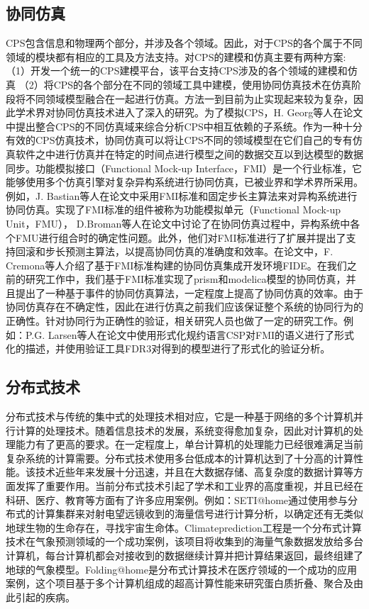 \subsection{协同仿真}
CPS包含信息和物理两个部分，并涉及各个领域。因此，对于CPS的各个属于不同领域的模块都有相应的工具及方法支持。对CPS的建模和仿真主要有两种方案: （1）开发一个统一的CPS建模平台，该平台支持CPS涉及的各个领域的建模和仿真 （2）将CPS的各个部分在不同的领域工具中建模，使用协同仿真技术在仿真阶段将不同领域模型融合在一起进行仿真。方法一到目前为止实现起来较为复杂，因此学术界对协同仿真技术进入了深入的研究。为了模拟CPS，H. Georg等人在论文\cite{Georg2014Analyzing}中提出整合CPS的不同仿真域来综合分析CPS中相互依赖的子系统。作为一种十分有效的CPS仿真技术，协同仿真可以将让CPS不同的领域模型在它们自己的专有仿真软件之中进行仿真并在特定的时间点进行模型之间的数据交互以到达模型的数据同步。功能模拟接口（Functional Mock-up Interface，FMI）\cite{Arnold2011FMI}是一个行业标准，它能够使用多个仿真引擎对复杂异构系统进行协同仿真，已被业界和学术界所采用。例如，J. Bastian等人在论文\cite{Bastian2011Master}中采用FMI标准和固定步长主算法来对异构系统进行协同仿真。实现了FMI标准的组件被称为功能模拟单元（Functional Mock-up Unit，FMU）\cite{Tripakis15}， D.Broman等人在论文\cite{Broman2013Determinate}中讨论了在协同仿真过程中，异构系统中各个FMU进行组合时的确定性问题。此外，他们对FMI标准进行了扩展并提出了支持回滚和步长预测主算法，以提高协同仿真的准确度和效率。在论文\cite{Cremona2016FIDE}中，F. Cremona等人介绍了基于FMI标准构建的协同仿真集成开发环境FIDE。在我们之前的研究工作\cite{LiuJWCD16}中，我们基于FMI标准实现了prism和modelica模型的协同仿真，并且提出了一种基于事件的协同仿真算法，一定程度上提高了协同仿真的效率。由于协同仿真存在不确定性，因此在进行仿真之前我们应该保证整个系统的协同行为的正确性。针对协同行为正确性的验证，相关研究人员也做了一定的研究工作。例如：P.G. Larsen等人在论文\cite{Larsen2016Integrated}中使用形式化规约语言CSP对FMI的语义进行了形式化的描述，并使用验证工具FDR3对得到的模型进行了形式化的验证分析。

\subsection{分布式技术}
分布式技术与传统的集中式的处理技术相对应，它是一种基于网络的多个计算机并行计算的处理技术。随着信息技术的发展，系统变得愈加复杂，因此对计算机的处理能力有了更高的要求。在一定程度上，单台计算机的处理能力已经很难满足当前复杂系统的计算需要。分布式技术使用多台低成本的计算机达到了十分高的计算性能。该技术近些年来发展十分迅速，并且在大数据存储、高复杂度的数据计算等方面发挥了重要作用。当前分布式技术引起了学术和工业界的高度重视，并且已经在科研、医疗、教育等方面有了许多应用案例。例如：SETI@home通过使用参与分布式的计算集群来对射电望远镜收到的海量信号进行计算分析，以确定还有无类似地球生物的生命存在，寻找宇宙生命体。Climateprediction工程是一个分布式计算技术在气象预测领域的一个成功案例，该项目将收集到的海量气象数据发放给多台计算机，每台计算机都会对接收到的数据继续计算并把计算结果返回，最终组建了地球的气象模型。Folding@home是分布式计算技术在医疗领域的一个成功的应用案例，这个项目基于多个计算机组成的超高计算性能来研究蛋白质折叠、聚合及由此引起的疾病。

